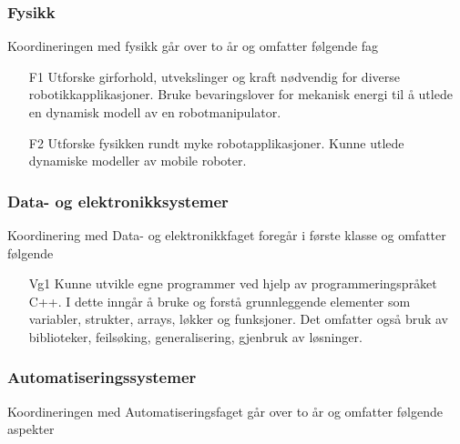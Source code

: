 	\subsubsection*{Fysikk}

	Koordineringen med fysikk går over to år og omfatter følgende fag

		\begin{itemize}

			\item[F1] Utforske girforhold, utvekslinger og kraft nødvendig for diverse robotikkapplikasjoner. Bruke bevaringslover for mekanisk energi til å utlede en dynamisk modell av en robotmanipulator.
			\item[F2] Utforske fysikken rundt myke robotapplikasjoner. Kunne utlede dynamiske modeller av mobile roboter.

		\end{itemize}


	\subsubsection*{Data- og elektronikksystemer}

	Koordinering med Data- og elektronikkfaget foregår i første klasse og omfatter følgende

		\begin{itemize}

			\item[Vg1] Kunne utvikle egne programmer ved hjelp av programmeringspråket C++. I dette inngår å bruke og forstå grunnleggende elementer som variabler, strukter, arrays, løkker og funksjoner. Det omfatter også bruk av biblioteker, feilsøking, generalisering, gjenbruk av løsninger.

		\end{itemize}


	\subsubsection*{Automatiseringssystemer}


		Koordineringen med Automatiseringsfaget går over to år og omfatter følgende aspekter


